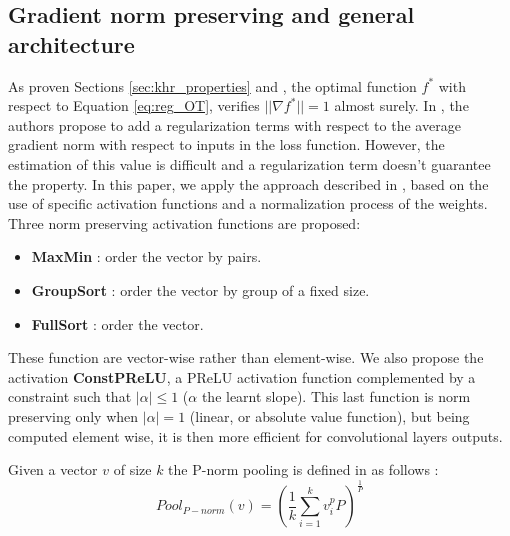 \subsection{Gradient norm preserving and general architecture}
\label{app:normpreserving}
As proven Sections \ref{sec:khr_properties} and , the optimal function $f^*$ with respect to Equation \ref{eq:reg_OT}, verifies $||\nabla f^* ||=1$ almost surely.
In \cite{gulrajani2017improved}, the authors propose to add a regularization terms with respect to the average gradient norm with respect to inputs in the loss function. However, the estimation of this value is difficult and a regularization term doesn't guarantee the property. In this paper, we apply the approach described in \cite{pmlr-v97-anil19a}, based on the use of specific activation functions and a normalization process of the weights. 
Three norm preserving activation functions are proposed:
\begin{itemize}
    \item \textbf{MaxMin} : order the vector by pairs.
    \item \textbf{GroupSort} : order the vector by group of a fixed size.
    \item \textbf{FullSort} : order the vector.
\end{itemize}
These function are vector-wise rather than element-wise. We also propose the activation  \textbf{ConstPReLU}, a PReLU \cite{He_2015} activation function complemented by a constraint such that $|\alpha|\leq 1$ ($\alpha$ the learnt slope). This last function is norm preserving only when $|\alpha|=1$ (linear, or absolute value function), but being computed element wise, it is then more efficient for convolutional layers outputs.

Given a vector $v$ of size $k$ the P-norm pooling is defined in \cite{boureau2010} as follows :
$$
Pool_{P-norm}(v)=\left(\frac{1}{k}\sum_{i=1}^k v_i^p P\right)^{\frac{1}{P}}
$$

